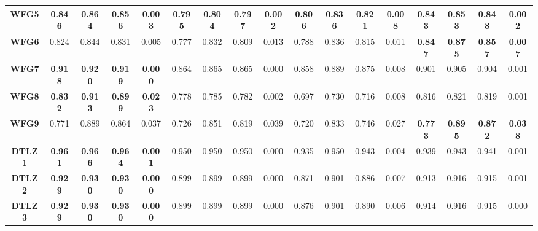 \begin{table*}[t]
{\begin{tabular}{cc|c|c|c|c|c|c|c|c|c|c|c|c|c|c|c}
\multicolumn{1}{c|}{\textbf{WFG5}}  & \textbf{0.846} & \textbf{0.864} & \textbf{0.856} & \textbf{0.003} & 0.795          & 0.804          & 0.797          & 0.002          & 0.806        & 0.836        & 0.821         & 0.008        & 0.843          & 0.853          & 0.848          & 0.002           \\ \hline
\multicolumn{1}{c|}{\textbf{WFG6}}  & 0.824          & 0.844          & 0.831          & 0.005          & 0.777          & 0.832          & 0.809          & 0.013          & 0.788        & 0.836        & 0.815         & 0.011        & \textbf{0.847} & \textbf{0.875} & \textbf{0.857} & \textbf{0.007}  \\ \hline
\multicolumn{1}{c|}{\textbf{WFG7}}  & \textbf{0.918} & \textbf{0.920} & \textbf{0.919} & \textbf{0.000} & 0.864          & 0.865          & 0.865          & 0.000          & 0.858        & 0.889        & 0.875         & 0.008        & 0.901          & 0.905          & 0.904          & 0.001           \\ \hline
\multicolumn{1}{c|}{\textbf{WFG8}}  & \textbf{0.832} & \textbf{0.913} & \textbf{0.899} & \textbf{0.023} & 0.778          & 0.785          & 0.782          & 0.002          & 0.697        & 0.730        & 0.716         & 0.008        & 0.816          & 0.821          & 0.819          & 0.001           \\ \hline
\multicolumn{1}{c|}{\textbf{WFG9}}  & 0.771          & 0.889          & 0.864          & 0.037          & 0.726          & 0.851          & 0.819          & 0.039          & 0.720        & 0.833        & 0.746         & 0.027        & \textbf{0.773} & \textbf{0.895} & \textbf{0.872} & \textbf{0.038}  \\ \hline
\multicolumn{1}{c|}{\textbf{DTLZ1}} & \textbf{0.961} & \textbf{0.966} & \textbf{0.964} & \textbf{0.001} & 0.950          & 0.950          & 0.950          & 0.000          & 0.935        & 0.950        & 0.943         & 0.004        & 0.939          & 0.943          & 0.941          & 0.001           \\ \hline
\multicolumn{1}{c|}{\textbf{DTLZ2}} & \textbf{0.929} & \textbf{0.930} & \textbf{0.930} & \textbf{0.000} & 0.899          & 0.899          & 0.899          & 0.000          & 0.871        & 0.901        & 0.886         & 0.007        & 0.913          & 0.916          & 0.915          & 0.001           \\ \hline
\multicolumn{1}{c|}{\textbf{DTLZ3}} & \textbf{0.929} & \textbf{0.930} & \textbf{0.930} & \textbf{0.000} & 0.899          & 0.899          & 0.899          & 0.000          & 0.876        & 0.901        & 0.890         & 0.006        & 0.914          & 0.916          & 0.915          & 0.000           \\ \hline

\end{tabular}}
\end{table*}
